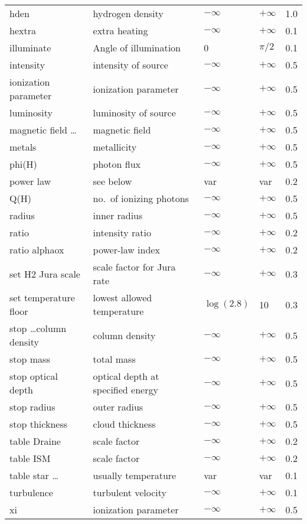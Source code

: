 \begin{table}
\begin{tabular}{lllll}
hden& hydrogen density& $-\infty$& $+\infty$& 1.0\\
hextra& extra heating& $-\infty$& $+\infty$& 0.1\\
illuminate& Angle of illumination& 0& $\pi/2$& 0.1\\
intensity& intensity of source& $-\infty$& $+\infty$& 0.5\\
ionization parameter& ionization parameter& $-\infty$& $+\infty$& 0.5\\
luminosity& luminosity of source& $-\infty$& $+\infty$& 0.5\\
magnetic field \ldots& magnetic field& $-\infty$& $+\infty$& 0.5\\
metals& metallicity& $-\infty$& $+\infty$& 0.5\\
phi(H)& photon flux& $-\infty$& $+\infty$& 0.5\\
power law& see below& var& var& 0.2\\
Q(H)& no.\ of ionizing photons& $-\infty$& $+\infty$& 0.5\\
radius& inner radius& $-\infty$& $+\infty$& 0.5\\
ratio& intensity ratio& $-\infty$& $+\infty$& 0.2\\
ratio alphaox& power-law index& $-\infty$& $+\infty$& 0.2\\
set H2 Jura scale& scale factor for Jura rate& $-\infty$& $+\infty$& 0.3\\
set temperature floor& lowest allowed temperature& $\log(2.8)$& 10& 0.3\\
stop \ldots column density& column density& $-\infty$& $+\infty$& 0.5\\
stop mass & total mass& $-\infty$& $+\infty$& 0.5\\
stop optical depth& optical depth at specified energy & $-\infty$& $+\infty$& 0.5\\
stop radius& outer radius& $-\infty$& $+\infty$& 0.5\\
stop thickness& cloud thickness& $-\infty$& $+\infty$& 0.5\\
table Draine& scale factor& $-\infty$& $+\infty$& 0.2\\
table ISM& scale factor& $-\infty$& $+\infty$& 0.2\\
table star \ldots& usually temperature& var& var& 0.1\\
turbulence& turbulent velocity& $-\infty$& $+\infty$& 0.1\\
xi& ionization parameter& $-\infty$& $+\infty$& 0.5\\
\hline
\end{tabular}
\end{table}

